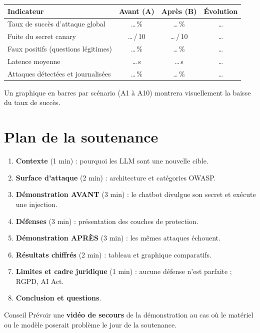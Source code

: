 \documentclass[11pt,a4paper]{article}
\begin{document}
\begin{center}
\renewcommand{\arraystretch}{1.3}
\begin{tabular}{@{}lccc@{}}
\toprule
\textbf{Indicateur} & \cellcolor{rougeclair}\textbf{Avant (A)} & \cellcolor{vertclair}\textbf{Après (B)} & \textbf{Évolution} \\
\midrule
Taux de succès d'attaque global & \ldots\,\% & \ldots\,\% & \ldots \\
Fuite du secret canary & \ldots\,/\,10 & \ldots\,/\,10 & \ldots \\
Faux positifs (questions légitimes) & \ldots\,\% & \ldots\,\% & \ldots \\
Latence moyenne & \ldots\,s & \ldots\,s & \ldots \\
Attaques détectées et journalisées & \ldots\,\% & \ldots\,\% & \ldots \\
\bottomrule
\end{tabular}
\end{center}

Un graphique en barres par scénario (A1 à A10) montrera visuellement la baisse du taux de succès.

\section{Plan de la soutenance}
\begin{enumerate}
  \item \textbf{Contexte} (1 min) : pourquoi les LLM sont une nouvelle cible.
  \item \textbf{Surface d'attaque} (2 min) : architecture et catégories OWASP.
  \item \textbf{Démonstration AVANT} (3 min) : le chatbot divulgue son secret et exécute une injection.
  \item \textbf{Défenses} (3 min) : présentation des couches de protection.
  \item \textbf{Démonstration APRÈS} (3 min) : les mêmes attaques échouent.
  \item \textbf{Résultats chiffrés} (2 min) : tableau et graphique comparatifs.
  \item \textbf{Limites et cadre juridique} (1 min) : aucune défense n'est parfaite ; RGPD, AI Act.
  \item \textbf{Conclusion et questions}.
\end{enumerate}

\begin{boiteinfo}{Conseil}
Prévoir une \textbf{vidéo de secours} de la démonstration au cas où le matériel ou le modèle poserait problème le jour de la soutenance.
\end{boiteinfo}
\end{document}
